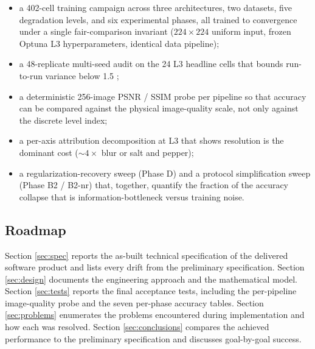 \begin{itemize}
  \item a 402-cell training campaign across three architectures, two
        datasets, five degradation levels, and six experimental phases, all
        trained to convergence under a single fair-comparison invariant
        ($224 \times 224$ uniform input, frozen Optuna L3 hyperparameters,
        identical data pipeline);
  \item a 48-replicate multi-seed audit on the 24 L3 headline cells that
        bounds run-to-run variance below 1.5 \Mpp{};
  \item a deterministic 256-image PSNR / SSIM probe per pipeline so that
        accuracy can be compared against the physical image-quality scale,
        not only against the discrete level index;
  \item a per-axis attribution decomposition at L3 that shows resolution is
        the dominant cost ($\sim 4 \times$ blur or salt and pepper);
  \item a regularization-recovery sweep (Phase D) and a protocol simplification
        sweep (Phase B2 / B2-nr) that, together, quantify the fraction of the
        accuracy collapse that is information-bottleneck versus training noise.
\end{itemize}

\subsection{Roadmap}
Section \ref{sec:spec} reports the as-built technical specification of the
delivered software product and lists every drift from the preliminary
specification. Section \ref{sec:design} documents the engineering approach
and the mathematical model. Section \ref{sec:tests} reports the final
acceptance tests, including the per-pipeline image-quality probe and the
seven per-phase accuracy tables. Section \ref{sec:problems} enumerates the
problems encountered during implementation and how each was resolved.
Section \ref{sec:conclusions} compares the achieved performance to the
preliminary specification and discusses goal-by-goal success.
